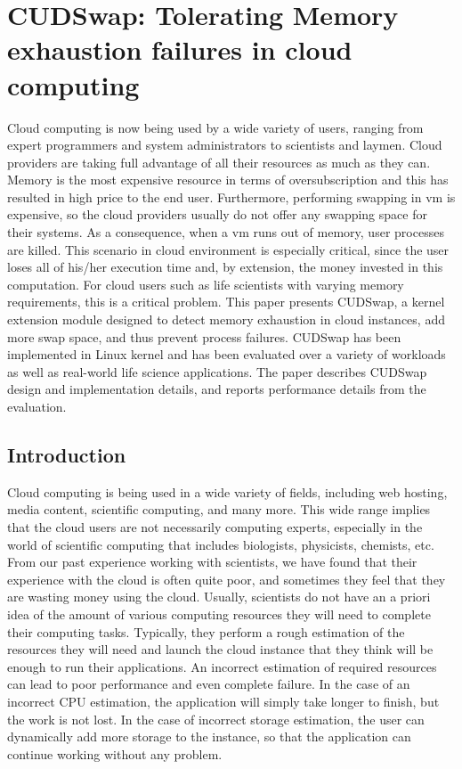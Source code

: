 \glsresetall

\section{CUDSwap: Tolerating Memory exhaustion failures in cloud computing}\label{section_cudswap}

Cloud computing is now being used by a wide variety of users, ranging from
expert programmers and system administrators to scientists and laymen.
Cloud providers are taking full advantage of all their resources as much as
they can. Memory is the most expensive resource in terms of oversubscription
and this has resulted in high price to the end user. Furthermore, performing
swapping in \gls{vm} is expensive, so the cloud providers
usually do not offer any swapping space for their systems. As a consequence,
when a \gls{vm} runs out of memory, user processes are killed. This scenario in
cloud environment is especially critical, since the user loses all of
his/her execution time and, by extension, the money invested in this
computation. For cloud users such as life scientists with varying memory
requirements, this is a critical problem. This paper presents CUDSwap,
a kernel extension module designed to detect memory exhaustion in cloud
instances, add more swap space, and thus prevent process failures. CUDSwap
has been implemented in Linux kernel and has been evaluated over a variety
of workloads as well as real-world life science applications. The paper
describes CUDSwap design and implementation details, and reports performance
details from the evaluation.

\subsection{Introduction}\label{sub_cudswap_Introduction}

Cloud computing is being used in a wide variety of fields, including web
hosting, media content, scientific computing, and many more. This wide range
implies that the cloud users are not necessarily computing experts,
especially in the world of scientific computing that includes biologists,
physicists, chemists, etc. From our past experience working with scientists,
we have found that their experience with the cloud is often quite poor,
and sometimes they feel that they are wasting money using the cloud. Usually,
scientists do not have an a priori idea of the amount of various computing
resources they will need to complete their computing tasks. Typically,
they perform a rough estimation of the resources they will need and launch
the cloud instance that they think will be enough to run their applications.
An incorrect estimation of required resources can lead to poor performance
and even complete failure. In the case of an incorrect CPU estimation, the
application will simply take longer to finish, but the work is not lost.
In the case of incorrect storage estimation, the user can dynamically add
more storage to the instance, so that the application can continue working
without any problem.

